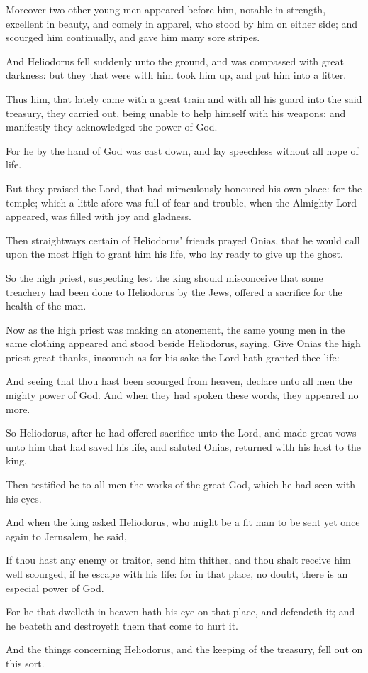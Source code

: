 {\par }{\PP {}Moreover two other young men appeared before him, notable in strength, excellent in beauty, and comely in apparel, who stood by him on either side; and scourged him continually, and gave him many sore stripes.
\par }{\PP {}And Heliodorus fell suddenly unto the ground, and was compassed with great darkness: but they that were with him took him up, and put him into a litter.
\par }{\PP {}Thus him, that lately came with a great train and with all his guard into the said treasury, they carried out, being unable to help himself with his weapons: and manifestly they acknowledged the power of God.
\par }{\PP {}For he by the hand of God was cast down, and lay speechless without all hope of life.
\par }{\PP {}But they praised the Lord, that had miraculously honoured his own place: for the temple; which a little afore was full of fear and trouble, when the Almighty Lord appeared, was filled with joy and gladness.
\par }{\PP {}Then straightways certain of Heliodorus’ friends prayed Onias, that he would call upon the most High to grant him his life, who lay ready to give up the ghost.
\par }{\PP {}So the high priest, suspecting lest the king should misconceive that some treachery had been done to Heliodorus by the Jews, offered a sacrifice for the health of the man.
\par }{\PP {}Now as the high priest was making an atonement, the same young men in the same clothing appeared and stood beside Heliodorus, saying, Give Onias the high priest great thanks, insomuch as for his sake the Lord hath granted thee life:
\par }{\PP {}And seeing that thou hast been scourged from heaven, declare unto all men the mighty power of God. And when they had spoken these words, they appeared no more.
\par }{\PP {}So Heliodorus, after he had offered sacrifice unto the Lord, and made great vows unto him that had saved his life, and saluted Onias, returned with his host to the king.
\par }{\PP {}Then testified he to all men the works of the great God, which he had seen with his eyes.
\par }{\PP {}And when the king asked Heliodorus, who might be a fit man to be sent yet once again to Jerusalem, he said,
\par }{\PP {}If thou hast any enemy or traitor, send him thither, and thou shalt receive him well scourged, if he escape with his life: for in that place, no doubt, there is an especial power of God.
\par }{\PP {}For he that dwelleth in heaven hath his eye on that place, and defendeth it; and he beateth and destroyeth them that come to hurt it.
\par }{\PP {}And the things concerning Heliodorus, and the keeping of the treasury, fell out on this sort.

}
